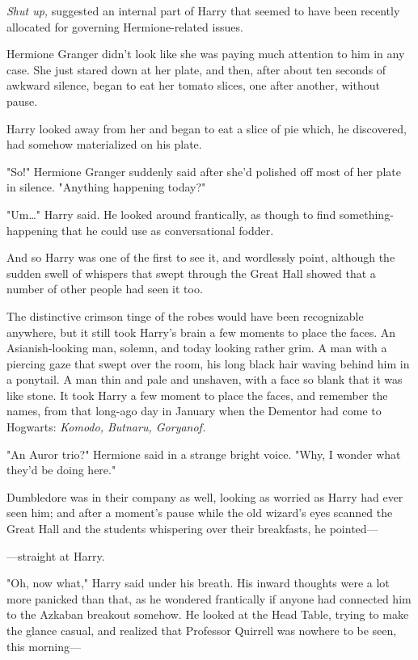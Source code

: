 \emph{Shut up,} suggested an internal part of Harry that seemed to have been 
recently allocated for governing Hermione-related issues.

Hermione Granger didn't look like she was paying much attention to him in any 
case. She just stared down at her plate, and then, after about ten seconds of 
awkward silence, began to eat her tomato slices, one after another, without 
pause.

Harry looked away from her and began to eat a slice of pie which, he 
discovered, had somehow materialized on his plate.

"So!" Hermione Granger suddenly said after she'd polished off most of her plate 
in silence. "Anything happening today?"

"Um{\ldots}" Harry said. He looked around frantically, as though to find 
something-happening that he could use as conversational fodder.

And so Harry was one of the first to see it, and wordlessly point, although the 
sudden swell of whispers that swept through the Great Hall showed that a number 
of other people had seen it too.

The distinctive crimson tinge of the robes would have been recognizable 
anywhere, but it still took Harry's brain a few moments to place the faces. An 
Asianish-looking man, solemn, and today looking rather grim. A man with a 
piercing gaze that swept over the room, his long black hair waving behind him 
in a ponytail. A man thin and pale and unshaven, with a face so blank that it 
was like stone. It took Harry a few moment to place the faces, and remember the 
names, from that long-ago day in January when the Dementor had come to 
Hogwarts: \emph{Komodo, Butnaru, Goryanof.}

"An Auror trio?" Hermione said in a strange bright voice. "Why, I wonder what 
they'd be doing here."

Dumbledore was in their company as well, looking as worried as Harry had ever 
seen him; and after a moment's pause while the old wizard's eyes scanned the 
Great Hall and the students whispering over their breakfasts, he pointed---

---straight at Harry.

"Oh, now what," Harry said under his breath. His inward thoughts were a lot 
more panicked than that, as he wondered frantically if anyone had connected him 
to the Azkaban breakout somehow. He looked at the Head Table, trying to make 
the glance casual, and realized that Professor Quirrell was nowhere to be seen, 
this morning---


